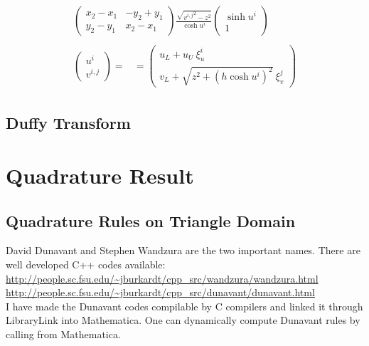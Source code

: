 \documentclass [10pt,letterpaper]{article}
\begin{document}
\begin{subequations}
\begin{align}
\begin{split}
\begin{pmatrix}
				x_2-x_1 	& 	-y_2+y_1	\\
				y_2-y_1 	& 	x_2-x_1		
			\end{pmatrix}
			\frac{ \sqrt{{v^{i,j}}^2-z^2} } { \cosh{u^i} } 
			\begin{pmatrix}
				\sinh{u^i}				\\
				1
			\end{pmatrix}
		\end{split}
		\\
		\begin{split} 
			\begin{pmatrix}
				u^i					\\
				v^{i,j}
			\end{pmatrix}
			=&
			=
			\begin{pmatrix} 
				u_L
				+ 
				u_U
				\ \xi_u^i				\\
				v_L
				+ 
				\sqrt{ z^2 + (h \cosh{u^i})^2 }
				\ \xi_v^j				
			\end{pmatrix}
		\end{split}
	\end{align}
\end{subequations}

\subsection{Duffy Transform}
\label{sub:duffy-transform}






\section{Quadrature Result}
\label{sec:quadrature-result}

\subsection{Quadrature Rules on Triangle Domain}
\label{sub:quadrature-rules-on-triangle-domain}
David Dunavant and Stephen Wandzura are the two important names.
There are well developed C++ codes available:
\\

\url{http://people.sc.fsu.edu/~jburkardt/cpp_src/wandzura/wandzura.html}
\\

\url{http://people.sc.fsu.edu/~jburkardt/cpp_src/dunavant/dunavant.html}
\\

I have made the Dunavant codes compilable by C compilers 
and linked it through LibraryLink into Mathematica.
One can dynamically compute Dunavant rules by calling from Mathematica.
\\
\end{document}
